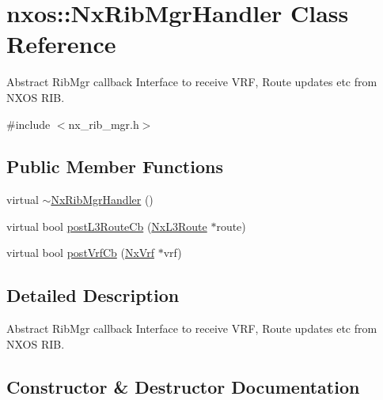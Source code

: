 \hypertarget{classnxos_1_1_nx_rib_mgr_handler}{}\section{nxos\+:\+:Nx\+Rib\+Mgr\+Handler Class Reference}
\label{classnxos_1_1_nx_rib_mgr_handler}


Abstract Rib\+Mgr callback Interface to receive V\+RF, Route updates etc from N\+X\+OS R\+IB.  




{\ttfamily \#include $<$nx\+\_\+rib\+\_\+mgr.\+h$>$}

\subsection*{Public Member Functions}
\begin{DoxyCompactItemize}
\item 
virtual \mbox{\hyperlink{classnxos_1_1_nx_rib_mgr_handler_a0b2d07d8f5547b196f6eda3d77f9ca97}{$\sim$\+Nx\+Rib\+Mgr\+Handler}} ()
\item 
virtual bool \mbox{\hyperlink{classnxos_1_1_nx_rib_mgr_handler_a1b742d50365fdece0ea47eb38300f7de}{post\+L3\+Route\+Cb}} (\mbox{\hyperlink{classnxos_1_1_nx_l3_route}{Nx\+L3\+Route}} $\ast$route)
\item 
virtual bool \mbox{\hyperlink{classnxos_1_1_nx_rib_mgr_handler_a2ed5a3ad9c0e55d21e18d88a19419a5e}{post\+Vrf\+Cb}} (\mbox{\hyperlink{classnxos_1_1_nx_vrf}{Nx\+Vrf}} $\ast$vrf)
\end{DoxyCompactItemize}


\subsection{Detailed Description}
Abstract Rib\+Mgr callback Interface to receive V\+RF, Route updates etc from N\+X\+OS R\+IB. 

\subsection{Constructor \& Destructor Documentation}
\mbox{\label{classnxos_1_1_nx_rib_mgr_handler_a0b2d07d8f5547b196f6eda3d77f9ca97}} 
